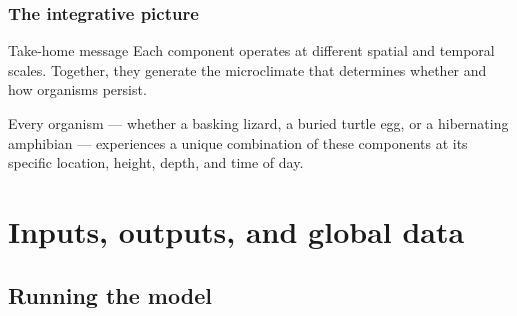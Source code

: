 \documentclass{beamer}
\begin{document}
%

\begin{frame}
  \frametitle{The integrative picture}

  \begin{block}{Take-home message}
    Each component operates at different spatial and temporal scales. Together, they generate the microclimate that determines whether and how organisms persist.
  \end{block}

  \vspace{0.3cm}

  Every organism --- whether a basking lizard, a buried turtle egg, or a hibernating amphibian --- experiences a unique combination of these components at its specific location, height, depth, and time of day.
\end{frame}

\section{Inputs, outputs, and global data}
\subsection{Running the model}
\end{document}

